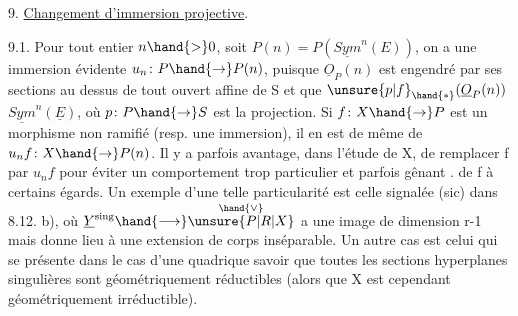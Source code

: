 
9. \uline{Changement d'immersion projective}.

9.1. Pour tout entier $n \hand{>} 0$, soit $P(n) = P(\underline{Sym}^n(E))$, on a une
immersion évidente $u_n\colon P \hand{\to} P(n)$, puisque $\underline{O}_P(n)$ est engendré par
ses sections au dessus de tout ouvert affine de S et que $\unsure{p|f}_{\hand{*}}(\underline{O}_P(n))$
$\underline{Sym}^n(\underline{E})$, où $p\colon P \hand{\to} S$ est la projection. Si $f\colon X\hand{\to} P$ est un morphisme
non ramifié (resp. une immersion), il en est de même de $u_n f\colon X \hand{\to} P(n)$.
Il y a parfois avantage, dans l'étude de X, de  remplacer f par $u_n f$ 
pour éviter un comportement trop particulier et parfois  gênant .
de f à certains égards. Un exemple d'une telle particularité est celle
 signalée (sic) dans 8.12. b),  où $\underline{Y}^{\mathrm{sing}} \hand{\longrightarrow} \overset{\hand{\vee}}{\unsure{P|R|X}}$ a une image de
dimension r-1 mais  donne lieu à une extension
de corps inséparable. Un autre cas est celui qui se présente dans le cas
d'une quadrique  savoir que
toutes les sections hyperplanes singulières sont géométriquement
réductibles (alors que X est cependant géométriquement irréductible).

